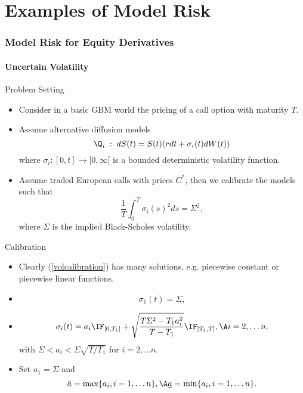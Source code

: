 
\part{Examples of Model Risk}

\section{Model Risk for Equity Derivatives}
\subsection{Uncertain Volatility}

{Problem Setting}
\begin{itemize}
\item<1-> Consider in a basic GBM world the pricing of a call option with maturity $T$.
\item<2-> Assume alternative diffusion models
\begin{equation}
\Q_i\;:\; dS(t) = S(t)(r dt + \sigma_i(t) dW(t))
\end{equation}
where $ \sigma_i: [0,t] \rightarrow [0, \infty[ $ is a bounded deterministic volatility function.
\item<3->
Assume traded European calls with prices $C^*$, then we calibrate the models such that
\begin{equation}\label{volcalibration}
\frac{1}{T} \int_0^T  \sigma_i(s)^2 ds = \Sigma^2,
\end{equation}
where $\Sigma$ is the implied Black-Scholes volatility.
\end{itemize}




{Calibration}
\begin{itemize}
\item<1-> Clearly (\ref{volcalibration}) has many solutions, e.g. piecewise constant or piecewise linear functions.
\item<2->
$$
\sigma_1(t) = \Sigma,
$$
\item<3->
$$
\sigma_i(t) = a_i \IF_{[0,T_1]}+ \sqrt{\frac{T\Sigma^2 -T_1a_i^2}{T-T_1}}\IF_{]T_1, T]}, \A i=2, \ldots n,
$$
with $\Sigma < a_i < \Sigma \sqrt{T/T_1}$ for  $ i =2, \ldots n$.
\item<4->
Set $a_1 = \Sigma$ and
$$
\bar{a}=\max\{a_i, i=1, \ldots n\}, \A \underline{a}=\min\{a_i, i=1, \ldots n\}.
$$
\end{itemize}





